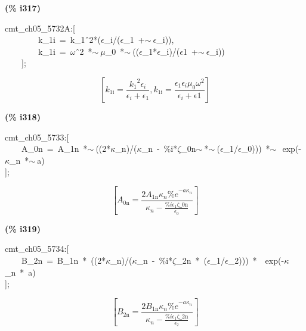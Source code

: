 \documentclass[fleqn]{article}
\begin{document}
\noindent
\begin{minipage}[t]{4.000000em}\color{red}\bfseries
(\% i317)	
\end{minipage}
\begin{minipage}[t]{\textwidth}\color{blue}
cmt\_ch05\_5732A:[\\
\ \ \ \ \ \ \ \ k\_1i\ =\ k\_1\^\ 2*(\ensuremath{\epsilon}\_i/(\ensuremath{\epsilon}\_1\ +\ensuremath{\sim\ }\ensuremath{\epsilon}\_i)),\\
\ \ \ \ \ \ \ \ k\_1i\ =\ \ensuremath{\omega}\^\ 2\ *\ensuremath{\sim\ }\ensuremath{\mu}\_0\ *\ensuremath{\sim\ }((\ensuremath{\epsilon}\_1*\ensuremath{\epsilon}\_i)/(\ensuremath{\epsilon}1\ +\ensuremath{\sim\ }\ensuremath{\epsilon}\_i))\ \ \ \ \\
\ \ \ \ ];
\end{minipage}
\[\displaystyle \tag{\% o317} 
\left[ {k_{\ensuremath{\mathrm{1i}}}}=\frac{{{{k_1}}^{2}} {{\epsilon }_i}}{{{\epsilon }_i}+{{\epsilon }_1}}\operatorname{,}{k_{\ensuremath{\mathrm{1i}}}}=\frac{{{\epsilon }_1} {{\epsilon }_i} {{\mu }_0} {{\omega }^{2}}}{{{\epsilon }_i}+\ensuremath{\mathrm{\epsilon 1}}}\right] \mbox{}
\]


\noindent
\begin{minipage}[t]{4.000000em}\color{red}\bfseries
(\% i318)	
\end{minipage}
\begin{minipage}[t]{\textwidth}\color{blue}
cmt\_ch05\_5733:[\\
\ \ \ \ A\_0n\ =\ A\_1n\ *\ensuremath{\sim\ }((2*\ensuremath{\kappa}\_n)/(\ensuremath{\kappa}\_n\ -\ \%i*\ensuremath{\zeta}\_0n\ensuremath{\sim\ }*\ensuremath{\sim\ }(\ensuremath{\epsilon}\_1/\ensuremath{\epsilon}\_0)))\ *\ensuremath{\sim\ }\ exp(-\ensuremath{\kappa}\_n\ *\ensuremath{\sim\ }a)\\
];
\end{minipage}
\[\displaystyle \tag{\% o318} 
\left[ {A_{\ensuremath{\mathrm{0n}}}}=\frac{2 {A_{\ensuremath{\mathrm{1n}}}} {{\kappa }_n} {{\% e}^{-a {{\kappa }_n}}}}{{{\kappa }_n}-\frac{\% i {{\epsilon }_1} \ensuremath{\mathrm{\zeta \_ 0n}}}{{{\epsilon }_0}}}\right] \mbox{}
\]


\noindent
\begin{minipage}[t]{4.000000em}\color{red}\bfseries
(\% i319)	
\end{minipage}
\begin{minipage}[t]{\textwidth}\color{blue}
cmt\_ch05\_5734:[\\
\ \ \ \ B\_2n\ =\ B\_1n\ *\ ((2*\ensuremath{\kappa}\_n)/(\ensuremath{\kappa}\_n\ -\ \%i*\ensuremath{\zeta}\_2n\ *\ (\ensuremath{\epsilon}\_1/\ensuremath{\epsilon}\_2)))\ *\ \ exp(-\ensuremath{\kappa}\_n\ *\ a)\\
];
\end{minipage}
\[\displaystyle \tag{\% o319} 
\left[ {B_{\ensuremath{\mathrm{2n}}}}=\frac{2 {B_{\ensuremath{\mathrm{1n}}}} {{\kappa }_n} {{\% e}^{-a {{\kappa }_n}}}}{{{\kappa }_n}-\frac{\% i {{\epsilon }_1} \ensuremath{\mathrm{\zeta \_ 2n}}}{{{\epsilon }_2}}}\right] \mbox{}
\]
\end{document}
